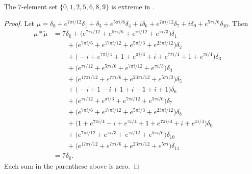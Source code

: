 \begin{prop}\label{prop7in12} The 7-element set
$\{0,1,2,5,6,8,9\}$ is extreme in .
\end{prop}

\begin{proof} Let $\mu =\delta_{0}  +   e^{ 7\pi i  / 12}\delta_{1}  +  \delta_{3}  +   e^{ 5\pi i  / 6}\delta_{4}  +    i \delta_{6}  +   e^{ 7\pi i  / 12}\delta_{7}  +    i \delta_{9}  +   e^{ 5\pi i  / 6}\delta_{10}
$.
Then
\begin{align*} \mu*\tilde \mu  &=7\delta_{0}   +  \big( e^{ 7 \pi i / 12}+ e^{ 5 \pi i / 6}+ e^{\pi i / 12}+ e^{\pi i / 3}\big)\delta_{1} \\& \qquad +  \big( e^{ 7 \pi i / 6}+ e^{ 17 \pi i / 12}+ e^{ 5 \pi i / 3}+ e^{ 23 \pi i / 12}\big)\delta_{2} \\& \qquad +  \big( -i + e^{ 7 \pi i / 4}+ 1+ e^{\pi i / 4}+  i + e^{ 7 \pi i / 4}+ 1+ e^{\pi i / 4}\big)\delta_{3} \\& \qquad +  \big( e^{\pi i / 12}+ e^{ 5 \pi i / 6}+ e^{ 7 \pi i / 12}+ e^{\pi i / 3}\big)\delta_{4} \\& \qquad +  \big( e^{ 17 \pi i / 12}+ e^{ 7 \pi i / 6}+ e^{ 23 \pi i / 12}+ e^{ 5 \pi i / 3}\big)\delta_{5} \\& \qquad +  \big( -i + 1- i+ 1+  i + 1+  i + 1\big)\delta_{6} \\& \qquad +  \big( e^{\pi i / 12}+ e^{\pi i / 3}+ e^{ 7 \pi i / 12}+ e^{ 5 \pi i / 6}\big)\delta_{7} \\& \qquad +  \big( e^{ 7 \pi i / 6}+ e^{ 17 \pi i / 12}+ e^{ 5 \pi i / 3}+ e^{ 23 \pi i / 12}\big)\delta_{8} \\& \qquad +  \big( 1+ e^{ 7 \pi i / 4}- i+ e^{\pi i / 4}+ 1+ e^{ 7 \pi i / 4}+  i + e^{\pi i / 4}\big)\delta_{9} \\& \qquad +  \big( e^{ 7 \pi i / 12}+ e^{\pi i / 3}+ e^{\pi i / 12}+ e^{ 5 \pi i / 6}\big)\delta_{10} \\& \qquad +  \big( e^{ 17 \pi i / 12}+ e^{ 7 \pi i / 6}+ e^{ 23 \pi i / 12}+ e^{ 5 \pi i}\big)\delta_{11} 
\\&=7\delta_0. 
\end{align*}
Each sum in the parenthese above is zero.

\end{proof}
